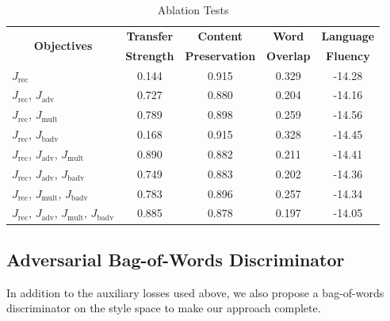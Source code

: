 \documentclass[11pt,a4paper]{article}
\newcommand{\tabh}[1]{\multicolumn{1}{c|}{\textbf{#1}}}
\newcommand{\tabc}[2]{\multicolumn{1}{|c|}{\multirow{#1}{*}{\textbf{#2}}}}
\newcommand{\loss}[1]{J_\text{#1}}
\begin{document}
\begin{table}[ht]
	\centering
	\begin{tabular}{| l | c | c | c | c |}
		\hline
		\tabc{2}{Objectives}                                     & \tabh{Transfer} & \tabh{Content}      & \tabh{Word}    & \tabh{Language} \\
		                                                         & \tabh{Strength} & \tabh{Preservation} & \tabh{Overlap} & \tabh{Fluency}  \\
		\hline
		\hline
		$\loss{rec}$                                             & 0.144           & 0.915               & 0.329          & -14.28          \\
		\hline
		$\loss{rec}$, $\loss{adv}$                               & 0.727           & 0.880               & 0.204          & -14.16          \\
		\hline
		$\loss{rec}$, $\loss{mult}$                              & 0.789           & 0.898               & 0.259          & -14.56          \\
		\hline
		$\loss{rec}$, $\loss{badv}$                              & 0.168           & 0.915               & 0.328          & -14.45          \\
		\hline
		$\loss{rec}$, $\loss{adv}$, $\loss{mult}$                & 0.890           & 0.882               & 0.211          & -14.41          \\
		\hline
		$\loss{rec}$, $\loss{adv}$, $\loss{badv}$                & 0.749           & 0.883               & 0.202          & -14.36          \\
		\hline
		$\loss{rec}$, $\loss{mult}$, $\loss{badv}$               & 0.783           & 0.896               & 0.257          & -14.34          \\
		\hline
		$\loss{rec}$, $\loss{adv}$, $\loss{mult}$, $\loss{badv}$ & 0.885           & 0.878               & 0.197          & -14.05          \\
		\hline
	\end{tabular}
	\caption{Ablation Tests}
	\label{tab:ablation-results}
\end{table}

\subsection{Adversarial Bag-of-Words Discriminator} \label{ssec:adversarial-bow-objective}

In addition to the auxiliary losses used above, we also propose a bag-of-words discriminator on the style space to make our approach complete.
\end{document}
